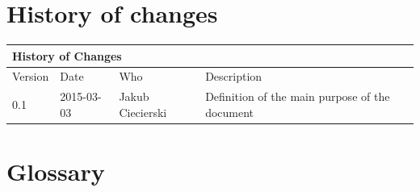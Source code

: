 \documentclass{article}
\begin{document}
\section{History of changes}

\begin{table}[h]
\hspace*{-2.1cm}
\large
\begin{tabular}{|l|l|l|l|}
\hline
\multicolumn{4}{|l|}{\cellcolor[HTML]{C0C0C0}History of Changes} \\ \hline
Version         & Date         & Who        & Description        \\ \hline
0.1         & 2015-03-03         & Jakub Ciecierski        & Definition of the main purpose of the document       \\ \hline
\end{tabular}
\end{table}

\newpage
\section{Glossary}
\end{document}

